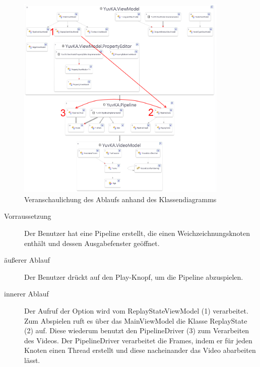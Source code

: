 \begin{figure}[h!]
\begin{center}
\includegraphics[width=0.9\textwidth]{Diagrams/visualization_TC3.png}
\end{center}
\caption{Veranschaulichung des Ablaufs anhand des Klassendiagramms}
\end{figure}
\begin{description}
	\item[Vorraussetzung] Der Benutzer hat eine Pipeline erstellt, die einen Weichzeichnungsknoten enthält und dessen Ausgabefenster geöffnet.
	\item[äußerer Ablauf] Der Benutzer drückt auf den Play-Knopf, um die Pipeline abzuspielen.
	\item[innerer Ablauf] Der Aufruf der Option wird vom ReplayStateViewModel (1) verarbeitet. Zum Abspielen ruft es  über das MainViewModel die Klasse ReplayState (2) auf. Diese wiederum benutzt den PipelineDriver (3) zum Verarbeiten des Videos. Der PipelineDriver verarbeitet die Frames, indem er für jeden Knoten einen Thread erstellt und diese nacheinander das Video abarbeiten lässt.
\end{description}
\newpage
